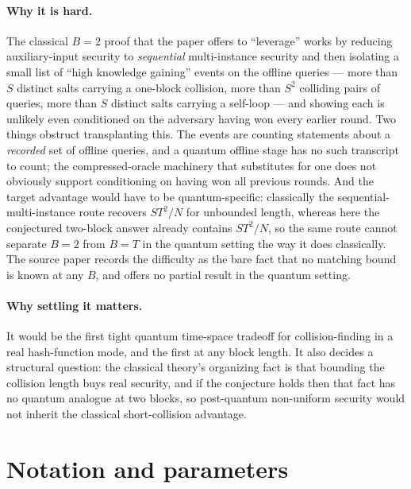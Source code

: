 \documentclass{aicr-conjecture}
\begin{document}
\paragraph{Why it is hard.}
The classical $B = 2$ proof that the paper offers to ``leverage'' works
by reducing auxiliary-input security to \emph{sequential} multi-instance
security and then isolating a small list of ``high knowledge gaining''
events on the offline queries --- more than $S$ distinct salts carrying
a one-block collision, more than $S^{2}$ colliding pairs of queries,
more than $S$ distinct salts carrying a self-loop --- and showing each
is unlikely even conditioned on the adversary having won every earlier
round. Two things obstruct transplanting this. The events are counting
statements about a \emph{recorded} set of offline queries, and a quantum
offline stage has no such transcript to count; the compressed-oracle
machinery that substitutes for one does not obviously support
conditioning on having won all previous rounds. And the target
advantage would have to be quantum-specific: classically the
sequential-multi-instance route recovers $ST^{2}/N$ for unbounded
length, whereas here the conjectured two-block answer already contains
$ST^{2}/N$, so the same route cannot separate $B = 2$ from $B = T$ in
the quantum setting the way it does classically. The source paper
records the difficulty as the bare fact that no matching bound is known
at any $B$, and offers no partial result in the quantum setting.

\paragraph{Why settling it matters.}
It would be the first tight quantum time-space tradeoff for
collision-finding in a real hash-function mode, and the first at any
block length. It also decides a structural question: the classical
theory's organizing fact is that bounding the collision length buys
real security, and if the conjecture holds then that fact has no
quantum analogue at two blocks, so post-quantum non-uniform security
would not inherit the classical short-collision advantage.

\section{Notation and parameters}\label{sec:notation}
\end{document}
